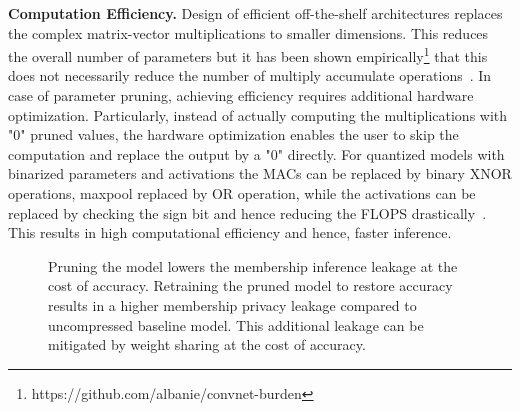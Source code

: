 \noindent\textbf{Computation Efficiency.} Design of efficient off-the-shelf architectures replaces the complex matrix-vector multiplications to smaller dimensions.
This reduces the overall number of parameters but it has been shown empirically\footnote{https://github.com/albanie/convnet-burden} that this does not necessarily reduce the number of multiply accumulate operations~\cite{article}.
In case of parameter pruning, achieving efficiency requires additional hardware optimization. Particularly, instead of actually computing the multiplications with "0" pruned values, the hardware optimization enables the user to skip the computation and replace the output by a "0" directly.
For quantized models with binarized parameters and activations the MACs can be replaced by binary XNOR operations, maxpool replaced by OR operation, while the activations can be replaced by checking the sign bit and hence reducing the FLOPS drastically~\cite{235489}.
This results in high computational efficiency and hence, faster inference.

\begin{figure}[!htb]
    \centering

\hspace{4mm}
\hspace{4mm}
\vspace{-1mm}
    \caption{Pruning the model lowers the membership inference leakage at the cost of accuracy. Retraining the pruned model to restore accuracy results in a higher membership privacy leakage compared to uncompressed baseline model. This additional leakage can be mitigated by weight sharing at the cost of accuracy.}
    \label{fig:NIAcause}
\end{figure}



